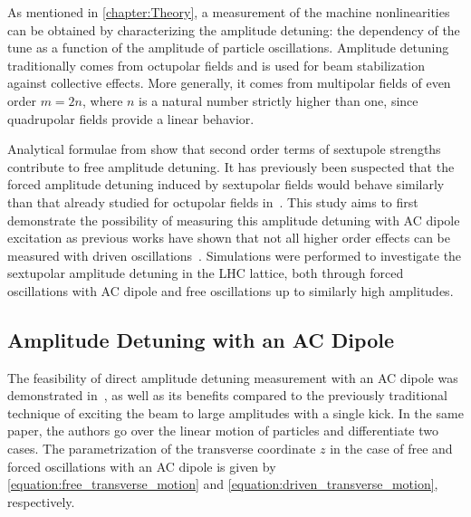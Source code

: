 
As mentioned in \cref{chapter:Theory}, a measurement of the machine nonlinearities can be obtained by characterizing the amplitude detuning: the dependency of the tune as a function of the amplitude of particle oscillations.
Amplitude detuning traditionally comes from octupolar fields and is used for beam stabilization against collective effects.
More generally, it comes from multipolar fields of even order \(m = 2n\), where \(n\) is a natural number strictly higher than one, since quadrupolar fields provide a linear behavior.

Analytical formulae from \cite{REPORT:Bengtsson:Smear_Tune_Shift, BOOK:Lee:Accelerator_physics,BOOK:Chao:Handbook_Accelerator_Physics_Engineering} show that second order terms of sextupole strengths contribute to free amplitude detuning.
It has previously been suspected that the forced amplitude detuning induced by sextupolar fields would behave similarly than that already studied for octupolar fields in~\cite{PRAB:White:Direct_Amplitude_Detuning_AC_Dipole}.
This study aims to first demonstrate the possibility of measuring this amplitude detuning with AC dipole excitation as previous works have shown that not all higher order effects can be measured with driven oscillations~\cite{PRAB:Persson:Suppression_Amplitude_Dependent_Closest_Tune_Approach}.
Simulations were performed to investigate the sextupolar amplitude detuning in the LHC lattice, both through forced oscillations with AC dipole and free oscillations up to similarly high amplitudes.

\subsection*{Amplitude Detuning with an AC Dipole}

The feasibility of direct amplitude detuning measurement with an AC dipole was demonstrated in~\cite{PRAB:White:Direct_Amplitude_Detuning_AC_Dipole}, as well as its benefits compared to the previously traditional technique of exciting the beam to large amplitudes with a single kick.
In the same paper, the authors go over the linear motion of particles and differentiate two cases.
The parametrization of the transverse coordinate \(z\) in the case of free and forced oscillations with an AC dipole is given by \cref{equation:free_transverse_motion} and \cref{equation:driven_transverse_motion}, respectively.

